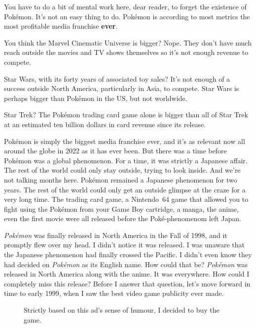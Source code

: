 \documentclass{book}
\begin{document}
You have to do a bit of mental work here, dear reader, to forget the existence of Pokémon. It’s not an easy thing to do. Pokémon is according to most metrics the most profitable media franchise \textbf{ever}.\par
You think the Marvel Cinematic Universe is bigger? Nope. They don’t have much reach outside the movies and TV shows themselves so it’s not enough revenue to compete.\par
Star Wars, with its forty years of associated toy sales? It’s not enough of a success outside North America, particularly in Asia, to compete. Star Wars is perhaps bigger than Pokémon in the US, but not worldwide.\par
Star Trek? The Pokémon trading card game alone is bigger than all of Star Trek at an estimated ten billion dollars in card revenue since its release.\par
Pokémon is simply the biggest media franchise ever, and it’s as relevant now all around the globe in 2022 as it has ever been. But there was a time before Pokémon was a global phenomenon. For a time, it was strictly a Japanese affair. The rest of the world could only stay outside, trying to look inside. And we’re not talking months here. Pokémon remained a Japanese phenomenon for two years. The rest of the world could only get an outside glimpse at the craze for a very long time. The trading card game, a Nintendo~64 game that allowed you to fight using the Pokémon from your Game Boy cartridge, a manga, the anime, even the first movie were all released before the Poké-phenomenom left Japan.\par
\emph{Pokémon} was finally released in North America in the Fall of 1998, and it promptly flew over my head. I didn’t notice it was released. I was unaware that the Japanese phenomenon had finally crossed the Pacific. I didn’t even know they had decided on \emph{Pokémon} as its English name. How could that be? \emph{Pokémon} was released in North America along with the anime. It was everywhere. How could I completely miss this release? Before I answer that question, let’s move forward in time to early 1999, when I saw the best video game publicity ever made.\par
\FloatBarrier\vspace{\baselineskip}\begin{figure}[H]\caption*{Strictly based on this ad’s sense of humour, I decided to buy the game.}\end{figure}
\end{document}
